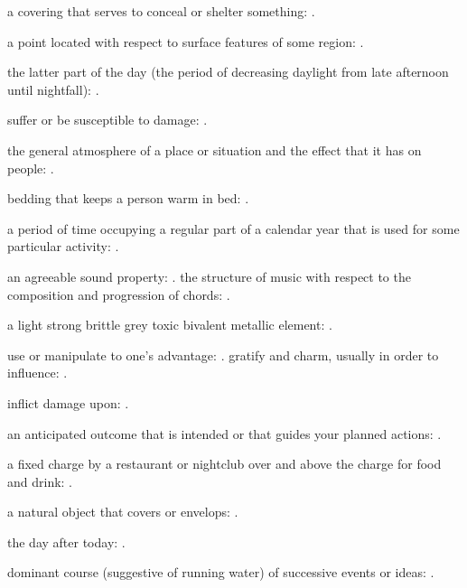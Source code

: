   a covering that serves to conceal or shelter something:   .

  a point located with respect to surface features of some region:   .

  the latter part of the day (the period of decreasing daylight from late afternoon until nightfall):   .

  suffer or be susceptible to damage: .

  the general atmosphere of a place or situation and the effect that it has on people:   .

  bedding that keeps a person warm in bed:   .

  a period of time occupying a regular part of a calendar year that is used for some particular activity: .

  an agreeable sound property: . the structure of music with respect to the composition and progression of chords:   .

  a light strong brittle grey toxic bivalent metallic element:   .

  use or manipulate to one's advantage:   . gratify and charm, usually in order to influence: .

  inflict damage upon: .

  an anticipated outcome that is intended or that guides your planned actions:   .

  a fixed charge by a restaurant or nightclub over and above the charge for food and drink:   .

  a natural object that covers or envelops:   .

  the day after today: .

  dominant course (suggestive of running water) of successive events or ideas:   .

